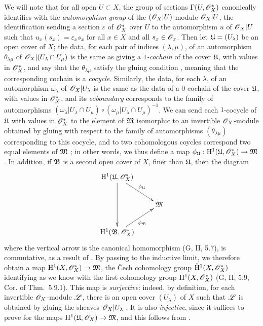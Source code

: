\begin{env}[5.4.7]
We will note that for all open $U\subset X$, the group of sections $\Gamma(U,\mathscr{O}_X^*)$ canonically identifies with the \emph{automorphism group} of the $(\mathscr{O}_X|U)$-module $\mathscr{O}_X|U$, the identification sending a section $\varepsilon$ of $\mathscr{O}_X^*$ over $U$ to the automorphism $u$ of $\mathscr{O}_X|U$ such that $u_x(s_x)=\varepsilon_x s_x$ for all $x\in X$ and all $s_x\in\mathscr{O}_x$.
Then let $\mathfrak{U}=(U_\lambda)$ be an open cover of $X$; the data, for each pair of indices $(\lambda,\mu)$, of an automorphism $\theta_{\lambda\mu}$ of $\mathscr{O}_X|(U_\lambda\cap U_\mu)$ is the same as giving a \emph{$1$-cochain} of the cover $\mathfrak{U}$, with values in $\mathscr{O}_X^*$, and say that the $\theta_{\lambda\mu}$ satisfy the gluing condition , meaning that the corresponding cochain is a \emph{cocycle}.
Similarly, the data, for each $\lambda$, of an automorphism $\omega_\lambda$ of $\mathscr{O}_X|U_\lambda$ is the same as the data of a $0$-cochain of the cover $\mathfrak{U}$, with values in $\mathscr{O}_X^*$, and its \emph{coboundary} corresponds to the family of automorphisms $(\omega_\lambda|U_\lambda\cap U_\mu)\circ(\omega_\mu|U_\lambda\cap U_\mu)^{-1}$.
We can send each $1$-cocycle of $\mathfrak{U}$ with values in $\mathscr{O}_X^*$ to the element of $\mathfrak{M}$ isomorphic to an invertible $\mathscr{O}_X$-module obtained by gluing with respect to the family of automorphisms $(\theta_{\lambda\mu})$ corresponding to this cocycle, and to two cohomologous coycles correspond two equal elements of $\mathfrak{M}$ ;
in other words, we thus define a map $\vphi_\fk{U}:\HH^1(\fk{U},\OO_X^*)\to\fk{M}$.
In addition, if $\mathfrak{B}$ is a second open cover of $X$, finer than $\mathfrak{U}$, then the diagram
\[
  \xymatrix{
    \HH^1(\fk{U},\OO_X^*)\ar[rd]^{\vphi_\fk{U}}\ar[dd]\\
    & \fk{M}\\
    \HH^1(\fk{B},\OO_X^*)\ar[ur]_{\vphi_\fk{B}}
  }
\]
where the vertical arrow is the canonical homomorphism (G, II, 5.7), is commutative, as a result of .
By passing to the inductive limit, we therefore obtain a map $\HH^1(X,\OO_X^*)\to\fk{M}$, the \v Cech cohomology group $\check{\mathrm{H}}^1(X,\mathscr{O}_X^*)$ identifying as we know with the first cohomology group $\mathrm{H}^1(X,\mathscr{O}_X^*)$ (G, II, 5.9, Cor. of Thm.~5.9.1).
This map is \emph{surjective}: indeed, by definition, for each invertible $\mathscr{O}_X$-module $\mathscr{L}$, there is an open cover $(U_\lambda)$ of $X$ such that $\mathscr{L}$ is obtained by gluing the sheaves $\mathscr{O}_X|U_\lambda$ .
It is also \emph{injective}, since it suffices to prove for the maps $\HH^1(\fk{U},\OO_X)\to\fk{M}$, and this follows from .

\end{env}

